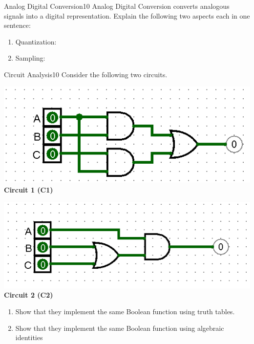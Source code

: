 \documentclass[twoside,a4paper]{article}
\begin{document}
\clearpage
\begin{task}{Analog Digital Conversion}{10}{}
  Analog Digital Conversion converts analogous signals into a digital representation. Explain the following two aspects
  each in one sentence:

  \begin{enumerate}
  \item{Quantization:\vspace*{6cm}}

    \item{Sampling: \vspace*{6cm}}

    \end{enumerate}
  
  
\end{task}
\clearpage
\begin{task}{Circuit Analysis}{10}{}
  Consider the following two circuits. 

  \includegraphics[width=.5\textwidth]{gfx/distributiv_circuit1.png}\\ \textbf{Circuit 1 (C1)}\par
  \includegraphics[width=.5\textwidth]{gfx/distributiv_circuit2.png}\\ \textbf{Circuit 2 (C2)}\par

  \begin{enumerate}
  \item{Show that they implement the same Boolean function using truth tables. \vspace*{6cm}}
  \item{Show that they implement the same Boolean function using algebraic identities \vspace*{2cm}}
    
  \end{enumerate}
  

  
\end{task}
\end{document}
